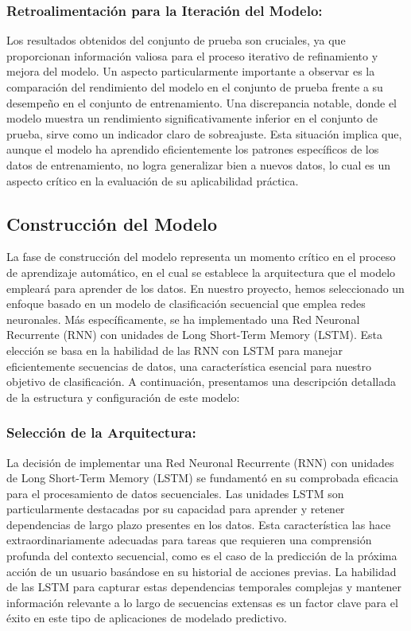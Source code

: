 \subsubsection{Retroalimentación para la Iteración del Modelo:}
Los resultados obtenidos del conjunto de prueba son cruciales, ya que proporcionan información valiosa para el proceso iterativo de refinamiento y mejora del modelo. Un aspecto particularmente importante a observar es la comparación del rendimiento del modelo en el conjunto de prueba frente a su desempeño en el conjunto de entrenamiento. Una discrepancia notable, donde el modelo muestra un rendimiento significativamente inferior en el conjunto de prueba, sirve como un indicador claro de sobreajuste. Esta situación implica que, aunque el modelo ha aprendido eficientemente los patrones específicos de los datos de entrenamiento, no logra generalizar bien a nuevos datos, lo cual es un aspecto crítico en la evaluación de su aplicabilidad práctica.


\subsection{Construcción del Modelo}
La fase de construcción del modelo representa un momento crítico en el proceso de aprendizaje automático, en el cual se establece la arquitectura que el modelo empleará para aprender de los datos. En nuestro proyecto, hemos seleccionado un enfoque basado en un modelo de clasificación secuencial que emplea redes neuronales. Más específicamente, se ha implementado una Red Neuronal Recurrente (RNN) con unidades de Long Short-Term Memory (LSTM). Esta elección se basa en la habilidad de las RNN con LSTM para manejar eficientemente secuencias de datos, una característica esencial para nuestro objetivo de clasificación. A continuación, presentamos una descripción detallada de la estructura y configuración de este modelo:

\subsubsection{Selección de la Arquitectura:} 
La decisión de implementar una Red Neuronal Recurrente (RNN) con unidades de Long Short-Term Memory (LSTM) se fundamentó en su comprobada eficacia para el procesamiento de datos secuenciales. Las unidades LSTM son particularmente destacadas por su capacidad para aprender y retener dependencias de largo plazo presentes en los datos. Esta característica las hace extraordinariamente adecuadas para tareas que requieren una comprensión profunda del contexto secuencial, como es el caso de la predicción de la próxima acción de un usuario basándose en su historial de acciones previas. La habilidad de las LSTM para capturar estas dependencias temporales complejas y mantener información relevante a lo largo de secuencias extensas es un factor clave para el éxito en este tipo de aplicaciones de modelado predictivo.

